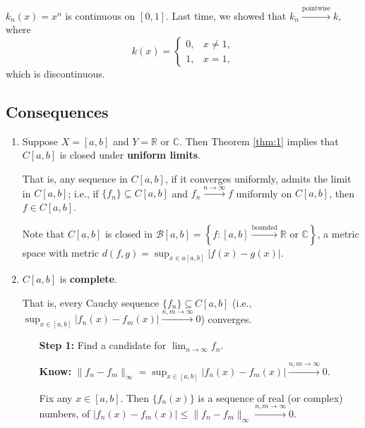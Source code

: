 \documentclass[letterpaper, reqno,11pt]{article}
\newcommand{\RR}{\mathbb{R}}
\newcommand{\CC}{\mathbb{C}}
\begin{document}
 $k_n(x) = x^n$ is continuous on $[0, 1]$. Last time, we showed that $k_n \xrightarrow{\text{pointwise}} k$, where
$$ k(x) = \left\{
\begin{array}{ll}
  0, & x \neq 1, \\
  1, & x = 1,
\end{array}
\right. $$
which is discontinuous.

\subsection{Consequences}

\begin{enumerate}
\item Suppose $X = [a, b]$ and $Y = \RR \text{ or } \CC$. Then Theorem \ref{thm:1} implies that $C[a, b]$ is closed under {\bf uniform limits}.

  That is, any sequence in $C[a, b]$, if it converges uniformly, admits the limit in $C[a, b]$; i.e., if $\{ f_n \} \subseteq C[a, b]$ and $f_n \xrightarrow{n \to \infty} f$ uniformly on $C[a, b]$, then $f \in C[a, b]$.

  Note that $C[a, b]$ is closed in $\mathcal B[a, b] = \left\{ f : [a, b] \xrightarrow{\text{bounded}} \RR \text{ or } \CC \right\}$, a metric space with metric $d(f, g) = \sup_{x \in a[a, b]} |f(x) - g(x)|$.
\item $C[a, b]$ is {\bf complete}.

  That is, every Cauchy sequence $\{ f_n \} \subseteq C[a, b]$ (i.e., $\sup_{x \in [a, b]} |f_n(x) - f_m(x)| \xrightarrow{n, m \to \infty} 0$) converges.

  \begin{enumerate}
  \item[{\bf Step 1:}] Find a candidate for $\lim_{n \to \infty} f_n$.

    {\bf Know:} $\lVert f_n - f_m \rVert_\infty = \sup_{x \in [a, b]} |f_n(x) - f_m(x)| \xrightarrow{n, m \to \infty} 0$.

    Fix any $x \in [a, b]$. Then $\{ f_n(x) \}$ is a sequence of real (or complex) numbers, of $|f_n(x) - f_m(x)| \leq \lVert f_n - f_m \rVert_\infty \xrightarrow{n, m \to \infty} 0$.


\end{enumerate}
\end{enumerate}
\end{document}
